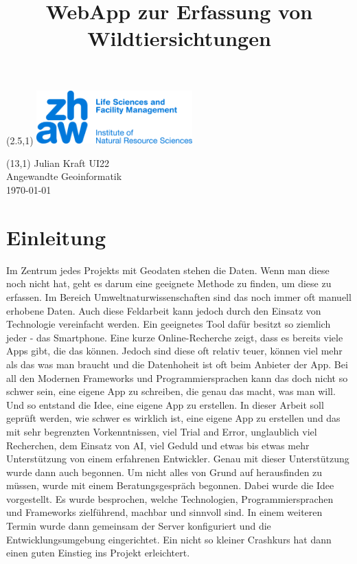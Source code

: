 \documentclass{article}
\title{WebApp zur Erfassung von Wildtiersichtungen}
\makeatletter
\renewcommand{\maketitle}{
  \begin{flushleft} 
    \Large\textmd{\@title} 
    \par
  \end{flushleft}
}
\makeatother
\begin{document}
\begin{textblock}{1}(2.5,1) %
        \includegraphics[width=6cm]{images/logo.jpg} %
\end{textblock}

\begin{textblock}{6}(13,1) %
        \raggedleft
        Julian Kraft UI22\\
        Angewandte Geoinformatik\\
        \today
\end{textblock}

\vspace*{1.5cm}


\maketitle

\tableofcontents


\section{Einleitung} %

Im Zentrum jedes Projekts mit Geodaten stehen die Daten. Wenn man diese noch nicht hat, geht es darum eine
geeignete Methode zu finden, um diese zu erfassen. Im Bereich Umweltnaturwissenschaften sind das noch
immer oft manuell erhobene Daten. Auch diese Feldarbeit kann jedoch durch den Einsatz von Technologie
vereinfacht werden. Ein geeignetes Tool dafür besitzt so ziemlich jeder - das Smartphone.
Eine kurze Online-Recherche zeigt, dass es bereits viele Apps gibt, die das können. Jedoch sind diese
oft relativ teuer, können viel mehr als das was man braucht und die Datenhoheit ist oft beim Anbieter der App.
Bei all den Modernen Frameworks und Programmiersprachen kann das doch nicht so schwer sein, eine eigene App
zu schreiben, die genau das macht, was man will. Und so entstand die Idee, eine eigene App zu erstellen.
In dieser Arbeit soll geprüft werden, wie schwer es wirklich ist, eine eigene App zu erstellen und das
mit sehr begrenzten Vorkenntnissen, viel Trial and Error, unglaublich viel Recherchen, dem
Einsatz von AI, viel Geduld und etwas bis etwas mehr Unterstützung von einem erfahrenen Entwickler.
Genau mit dieser Unterstützung wurde dann auch begonnen. Um nicht alles von Grund auf herausfinden zu müssen,
wurde mit einem Beratungsgespräch begonnen. Dabei wurde die Idee vorgestellt. Es wurde besprochen, welche
Technologien, Programmiersprachen und Frameworks zielführend, machbar und sinnvoll sind.
In einem weiteren Termin wurde dann gemeinsam der Server konfiguriert und die Entwicklungsumgebung eingerichtet.
Ein nicht so kleiner Crashkurs hat dann einen guten Einstieg ins Projekt erleichtert.
\end{document}
